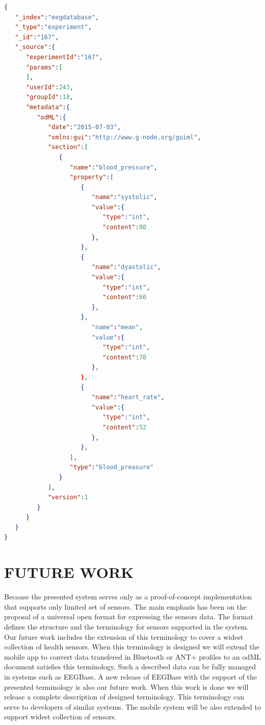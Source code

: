 \documentclass[a4paper,twoside]{article}
\begin{document}
\begin{lstlisting}[language=json,caption=blood preasure examle, label=odml_example]
{
   "_index":"eegdatabase",
   "_type":"experiment",
   "_id":"167",
   "_source":{
      "experimentId":"167",
      "params":[
      ],
      "userId":243,
      "groupId":18,
      "metadata":{
         "odML":{
            "date":"2015-07-03",
            "xmlns:gui":"http://www.g-node.org/guiml",
            "section":[
               {
                  "name":"blood_pressure",
                  "property":[
                     {
                        "name":"systolic",
                        "value":{
                           "type":"int",
                           "content":80
                        },
                     },
                     {
                        "name":"dyastolic",
                        "value":{
                           "type":"int",
                           "content":60
                        },
                     },
                        "name":"mean",
                        "value":{
                           "type":"int",
                           "content":70
                        },
                     },
                     {
                        "name":"heart_rate",
                        "value":{
                           "type":"int",
                           "content":52
                        },
                     },
                  ],
                  "type":"blood_preasure"
               }
            ],
            "version":1
         }       
      }   
   } 
}
\end{lstlisting}


\section{\uppercase{Future Work}}
\label{future-work}
\noindent
Because the presented system serves only as a proof-of-concept implementation that supports only limited set of sensors. The main emphasis has been on the proposal of a universal open format for expressing the sensors data. The format defines the structure and the terminology for sensors supported in the system. Our future work includes the extension of this terminology to cover a widest collection of health sensors. When this terminology is designed we will extend the mobile app to convert data transfered in Bluetooth or ANT+ profiles to an odML document satisfies this terminology. Such a described data can be fully managed in systems such as EEGBase. A new release of EEGBase with the support of the presented terminology is also our future work. When this work is done we will release a complete description of designed terminology. This terminology can serve to developers of similar systems. The mobile system will be also extended to support widest collection of sensors.
\end{document}
